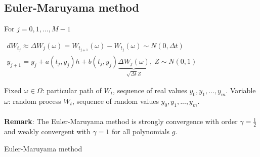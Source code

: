 \documentclass{article}
\begin{document}
\subsection{Euler-Maruyama method}
For $j=0,1,...,M-1$
\begin{center}
	$\begin{gathered}dW_{t_{j}}\approx \Delta W_{j}\left( \omega \right)  =W_{t_{j+1}}\left( \omega \right)  -W_{t_{j}}\left( \omega \right)  \sim N\left( 0,\Delta t\right)  \\ y_{j+1}=y_{j}+a\left( t_{j},y_{j}\right)  h+b\left( t_{j},y_{j}\right)  \underbrace{\Delta W_{j}\left( \omega \right)  }_{\sqrt{\Delta t} Z} ,\  Z\sim N\left( 0,1\right)  \end{gathered} $
\end{center}
Fixed $\omega \in \Omega $: particular path of $W_{t}$, sequence of real values $y_{0},y_{1},...,y_{m}$. Variable $\omega $: random process $W_{t}$, sequence of random values $y_{0},y_{1},...,y_{m}$.
\\~\\\textbf{Remark}:
The Euler-Maruyama method is strongly convergence with order $\gamma =\frac{1}{2} $ and weakly convergent with $\gamma =1$ for all polynomials $g$.

\begin{algorithm}
\caption{Euler-Maruyama method}\label{algorithm}
\end{algorithm}
\end{document}
